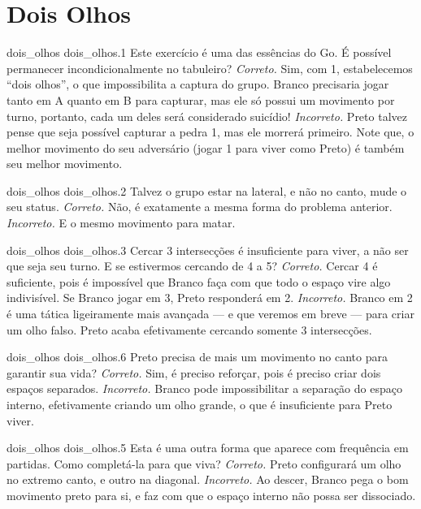 \chapter{Dois Olhos}

\emptypage

\problemAnswerDiagram
  {dois_olhos}
  {dois_olhos.1}
  {Este exercício é uma das essências do Go. É possível permanecer incondicionalmente no tabuleiro?}
  {\emph{Correto.} Sim, com 1, estabelecemos ``dois olhos'', o que impossibilita a captura do grupo. Branco precisaria jogar tanto em A quanto em B para capturar, mas ele só possui um movimento por turno, portanto, cada um deles será considerado suicídio!}
  {\emph{Incorreto.} Preto talvez pense que seja possível capturar a pedra 1, mas ele morrerá primeiro. Note que, o melhor movimento do seu adversário (jogar 1 para viver como Preto) é também seu melhor movimento.}

\problemAnswerDiagram
  {dois_olhos}
  {dois_olhos.2}
  {Talvez o grupo estar na lateral, e não no canto, mude o seu status.}
  {\emph{Correto.} Não, é exatamente a mesma forma do problema anterior.}
  {\emph{Incorreto.} E o mesmo movimento para matar.}

\problemAnswerDiagram
  {dois_olhos}
  {dois_olhos.3}
  {Cercar 3 intersecções é insuficiente para viver, a não ser que seja seu turno. E se estivermos cercando de 4 a 5?}
  {\emph{Correto.} Cercar 4 é suficiente, pois é impossível que Branco faça com que todo o espaço vire algo indivisível. Se Branco jogar em 3, Preto responderá em 2.}
  {\emph{Incorreto.} Branco em 2 é uma tática ligeiramente mais avançada --- e que veremos em breve --- para criar um olho falso. Preto acaba efetivamente cercando somente 3 intersecções.}

\problemAnswerDiagram
  {dois_olhos}
  {dois_olhos.6}
  {Preto precisa de mais um movimento no canto para garantir sua vida?}
  {\emph{Correto.} Sim, é preciso reforçar, pois é preciso criar dois espaços separados.}
  {\emph{Incorreto.} Branco pode impossibilitar a separação do espaço interno, efetivamente criando um olho grande, o que é insuficiente para Preto viver.}

\problemAnswerDiagram
  {dois_olhos}
  {dois_olhos.5}
  {Esta é uma outra forma que aparece com frequência em partidas. Como completá-la para que viva?}
  {\emph{Correto.} Preto configurará um olho no extremo canto, e outro na diagonal.}
  {\emph{Incorreto.} Ao descer, Branco pega o bom movimento preto para si, e faz com que o espaço interno não possa ser dissociado.}